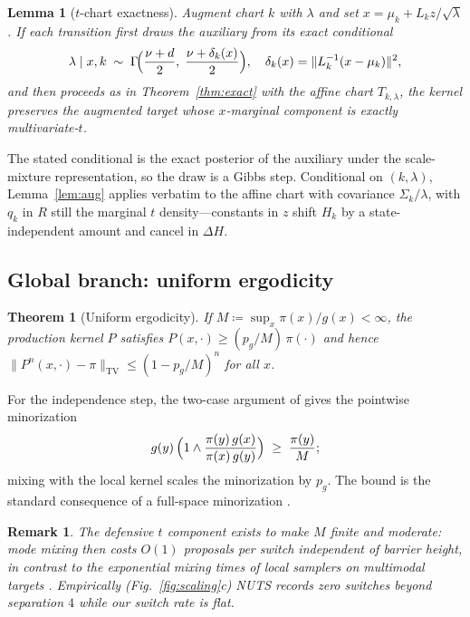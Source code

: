 \documentclass[10pt,journal,compsoc]{IEEEtran}
\newtheorem{theorem}{Theorem}
\newtheorem{lemma}{Lemma}
\newtheorem{remark}{Remark}
\newcommand{\TV}{\mathrm{TV}}
\begin{document}
\begin{lemma}[$t$-chart exactness]\label{lem:tchart}
Augment chart $k$ with $\lambda$ and set $x=\mu_k+L_kz/\sqrt\lambda$. If
each transition first draws the auxiliary from its exact conditional
\begin{equation}
\lambda\mid x,k\;\sim\;
\Gamma\!\Bigl(\frac{\nu+d}{2},\;\frac{\nu+\delta_k(x)}{2}\Bigr),
\quad
\delta_k(x)=\lVert L_k^{-1}(x-\mu_k)\rVert^2,\notag
\end{equation}
and then proceeds as in
Theorem~\ref{thm:exact} with the affine chart
$T_{k,\lambda}$, the kernel preserves the augmented target whose
$x$-marginal component is exactly multivariate-$t$.
\end{lemma}
\begin{IEEEproof}
The stated conditional is the exact posterior of the auxiliary under the
scale-mixture representation, so the draw is a Gibbs step. Conditional on
$(k,\lambda)$, Lemma~\ref{lem:aug} applies verbatim to the affine chart with
covariance $\Sigma_k/\lambda$, with $q_k$ in $R$ still the marginal $t$
density---constants in $z$ shift $H_k$ by a state-independent amount and
cancel in $\Delta H$.
\end{IEEEproof}

\subsection{Global branch: uniform ergodicity}
\begin{theorem}[Uniform ergodicity]\label{thm:ue}
If $M\coloneqq\sup_x\pi(x)/g(x)<\infty$, the production kernel $P$
satisfies $P(x,\cdot)\ge (p_g/M)\,\pi(\cdot)$ and hence
$\|P^n(x,\cdot)-\pi\|_{\TV}\le(1-p_g/M)^n$ for all $x$.
\end{theorem}
\begin{IEEEproof}
For the independence step, the two-case argument of \cite{mengersen1996}
gives the pointwise minorization
\begin{equation}
g(y)\,\Bigl(1\wedge\frac{\pi(y)\,g(x)}{\pi(x)\,g(y)}\Bigr)
\;\ge\;\frac{\pi(y)}{M};\notag
\end{equation}
mixing with the local kernel scales the minorization by $p_g$. The bound is the standard consequence of a
full-space minorization \cite{roberts2004}.
\end{IEEEproof}

\begin{remark}
The defensive $t$ component exists to make $M$ finite and moderate: mode
mixing then costs $O(1)$ proposals per switch \emph{independent of barrier
height}, in contrast to the exponential mixing times of local samplers on
multimodal targets \cite{mangoubi2018}. Empirically
(Fig.~\ref{fig:scaling}c) NUTS records zero switches beyond separation $4$
while our switch rate is flat.
\end{remark}
\end{document}
